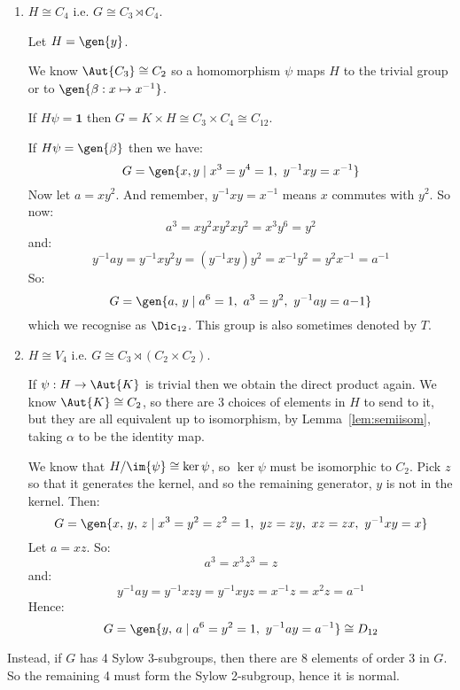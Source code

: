 \begin{enumerate}
    \item \(H \cong C_4\) i.e. \(G \cong C_3 \rtimes C_4\).

        Let \(H = \gen{y}\).

        We know \(\Aut{C_3} \cong C_2\) so a homomorphism \(\psi\) maps \(H\) to the trivial group or to \(\gen{\beta:x
        \mapsto x^{-1}}\).

        If \(H\psi = \bm{1}\) then \(G = K \times H \cong C_3 \times C_4 \cong C_{12}\).

        If \(H\psi = \gen{\beta}\) then we have:
        \[G = \gen{x, y \mid x^3 = y^4 = 1,\ y^{-1}xy = x^{-1}}\]
        Now let \(a = xy^2\).
        And remember, \(y^{-1}xy = x^{-1}\) means \(x\) commutes with \(y^2\).
        So now:
        \[a^3 = xy^2xy^2xy^2 = x^3y^6 = y^2\]
        and:
        \[y^{-1}ay = y^{-1}xy^2y = (y^{-1}xy)y^2 = x^{-1}y^2 = y^2x^{-1} = a^{-1}\]
        So:
        \[G = \gen{a,\,y \mid a^6 = 1,\ a^3 = y^2,\ y^{-1}ay = a{-1}}\]
        which we recognise as \(\Dic_{12}\).
        This group is also sometimes denoted by \(T\).

    \item \(H \cong V_4\) i.e. \(G \cong C_3 \rtimes (C_2 \times C_2)\).

        If \(\psi:H \to \Aut{K}\) is trivial then we obtain the direct product again.
        We know \(\Aut{K} \cong C_2\), so there are 3 choices of elements in \(H\) to send to it, but they are all
        equivalent up to isomorphism, by Lemma~\ref{lem:semiisom}, taking \(\alpha\) to be the identity map.

        We know that \(H / \im{\psi} \cong \ker{\psi}\), so \(\ker{\psi}\) must be isomorphic to \(C_2\).
        Pick \(z\) so that it generates the kernel, and so the remaining generator, \(y\) is not in the kernel.
        Then:
        \[G = \gen{x,\,y,\,z \mid x^3 = y^2 = z^2 = 1,\ yz = zy,\ xz = zx,\ y^{-1}xy = x}\]
        Let \(a = xz\).
        So:
        \[a^3 = x^3z^3 = z\]
        and:
        \[ y^{-1}ay = y^{-1}xzy = y^{-1}xyz = x^{-1}z = x^2z = a^{-1}\]
        Hence:
        \[G = \gen{y,\,a \mid a^6 = y^2 = 1,\ y^{-1}ay = a^{-1}} \cong D_{12}\]
\end{enumerate}

Instead, if \(G\) has 4 Sylow 3-subgroups, then there are 8 elements of order 3 in \(G\).
So the remaining 4 must form the Sylow 2-subgroup, hence it is normal.

